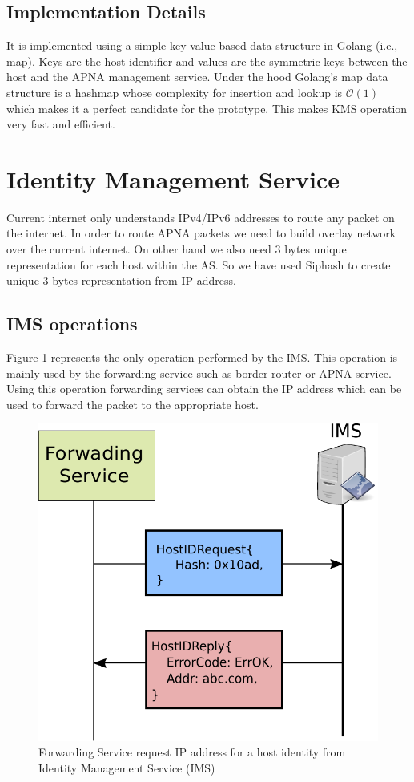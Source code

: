 \subsection{Implementation Details}
It is implemented using a simple key-value based data structure in Golang (i.e., map). Keys are the host identifier and values are the symmetric keys between the host and the APNA management service. Under the hood Golang's map data structure is a hashmap whose complexity for insertion and lookup is $\mathcal{O}(1)$ which makes it a perfect candidate for the prototype. This makes KMS operation very fast and efficient.

\section{Identity Management Service} \label{sec:ims}
Current internet only understands IPv4/IPv6 addresses to route any packet on the internet. In order to route APNA packets we need to build overlay network over the current internet. On other hand we also need 3 bytes unique representation for each host within the AS. So we have used Siphash \cite{siphash} to create unique 3 bytes representation from IP address.

\subsection{IMS operations}
Figure \ref{fig:ims_request} represents the only operation performed by the IMS. This operation is mainly used by the forwarding service such as border router or APNA service. Using this operation forwarding services can obtain the IP address which can be used to forward the packet to the appropriate host.

\begin{figure}[th!]
\centering
\includegraphics[scale=0.6]{Figures/siphash.pdf}
\decoRule
\caption[Host Identity Service]{Forwarding Service request IP address for a host identity from Identity Management Service (IMS)}
\label{fig:ims_request}
\end{figure}

